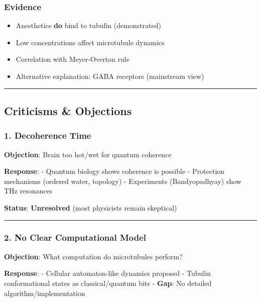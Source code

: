 \subsubsection{Evidence}\label{evidence}

\begin{itemize}
\tightlist
\item
  Anesthetics \textbf{do} bind to tubulin (demonstrated)
\item
  Low concentrations affect microtubule dynamics
\item
  Correlation with Meyer-Overton rule
\item
  Alternative explanation: GABA receptors (mainstream view)
\end{itemize}

\begin{center}\rule{0.5\linewidth}{0.5pt}\end{center}

\subsection{Criticisms \& Objections}\label{criticisms-objections}

\subsubsection{1. Decoherence Time}\label{decoherence-time}

\textbf{Objection}: Brain too hot/wet for quantum coherence

\textbf{Response}: - Quantum biology shows coherence is possible -
Protection mechanisms (ordered water, topology) - Experiments
(Bandyopadhyay) show THz resonances

\textbf{Status}: \textbf{Unresolved} (most physicists remain skeptical)

\begin{center}\rule{0.5\linewidth}{0.5pt}\end{center}

\subsubsection{2. No Clear Computational
Model}\label{no-clear-computational-model}

\textbf{Objection}: What computation do microtubules perform?

\textbf{Response}: - Cellular automaton-like dynamics proposed - Tubulin
conformational states as classical/quantum bits - \textbf{Gap}: No
detailed algorithm/implementation


